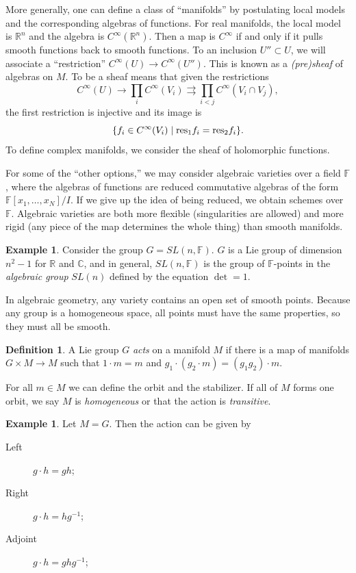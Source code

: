 \documentclass[leqno, openany]{memoir}
\theoremstyle{definition}
\newtheorem{defn}[thm]{Definition}
\newtheorem{exm}[thm]{Example}
\theoremstyle{remark}
\theoremstyle{plain}
\theoremstyle{definition}
\theoremstyle{remark}
\newcommand{\F}{\mathbb{F}}
\newcommand{\R}{\mathbb{R}}
\newcommand{\C}{\mathbb{C}}
\newcommand{\mr}[1]{\mathrm{#1}}
\begin{document}
More generally, one can define a class of ``manifolds'' by postulating local models and the corresponding algebras of functions. For real manifolds, the local model is $\R^n$ and the algebra is $C^{\infty}(\R^n)$. Then a map is $C^{\infty}$ if and only if it pulls smooth functions back to smooth functions. To an inclusion $U'' \subset U$, we will associate a ``restriction'' $C^{\infty}(U) \to C^{\infty}(U'')$. This is known as a \textit{(pre)sheaf} of algebras on $M$. To be a sheaf means that given the restrictions
\[ C^{\infty}(U) \to \prod_i C^{\infty}(V_i) \rightrightarrows \prod_{i<j} C^{\infty}(V_i \cap V_j), \]
the first restriction is injective and its image is
\[ \qty{ f_i \in C^{\infty}(V_i) \mid \mr{res}_1 f_i = \mr{res}_2 f_i }. \]
To define complex manifolds, we consider the sheaf of holomorphic functions.

For some of the ``other options,'' we may consider algebraic varieties over a field $\mathbb{F}$, where the algebras of functions are reduced commutative algebras of the form $\mathbb{F}[x_1, \ldots, x_N] / I$. If we give up the idea of being reduced, we obtain schemes over $\mathbb{F}$. Algebraic varieties are both more flexible (singularities are allowed) and more rigid (any piece of the map determines the whole thing) than smooth manifolds.

\begin{exm}
    Consider the group $G = SL(n,\F)$. $G$ is a Lie group of dimension $n^2-1$ for $\R$ and $\C$, and in general, $SL(n,\F)$ is the group of $\F$-points in the \textit{algebraic group} $SL(n)$ defined by the equation $\det = 1$.
\end{exm}

In algebraic geometry, any variety contains an open set of smooth points. Because any group is a homogeneous space, all points must have the same properties, so they must all be smooth.

\begin{defn}
    A Lie group $G$ \textit{acts} on a manifold $M$ if there is a map of manifolds $G \times M \to M$ such that $1 \cdot m = m$ and $g_1 \cdot (g_2 \cdot m) = (g_1g_2) \cdot m$.

    For all $m \in M$ we can define the orbit and the stabilizer. If all of $M$ forms one orbit, we say $M$ is \textit{homogeneous} or that the action is \textit{transitive}.
\end{defn}

\begin{exm}
    Let $M = G$. Then the action can be given by
    \begin{description}
        \item[Left] $g \cdot h = gh$;
        \item[Right] $g \cdot h = hg^{-1}$;
        \item[Adjoint] $g \cdot h = g h g^{-1}$;
        \end{description}
\end{exm}
\end{document}
